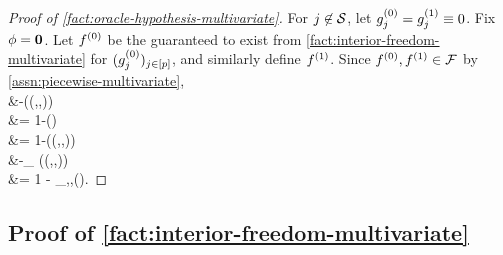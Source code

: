 \begin{proof}[Proof of \cref{fact:oracle-hypothesis-multivariate}]
For $j\not\in \mathcal{S}$, let $g^{(0)}_{j} = g^{(1)}_{j} \equiv 0$.
Fix $\phi = \mathbf{0}$.
Let $f^{(0)}$ be the \modelname{} guaranteed to exist from \cref{fact:interior-freedom-multivariate} for $(g^{(0)}_{j})_{j\in[p]}$, and similarly define $f^{(1)}$. Since $f^{(0)},f^{(1)}\in\mathcal{F}$ by \cref{assn:piecewise-multivariate},
\*[
    \specsym_{\expdef,\covdist,\covval}(\oraclehyptest) 
    &= \inf_{\model\in\modelspace\nullind} [1-\oraclehyptest(\expdef(\model,\covdist,\covval))] \\
    &-\oraclehyptest(\expdef(\model\nullind,\covdist,\covval)) \\
    &= 1-\oraclehyptest() \\
    &= 1-\oraclehyptest(\expdef(\model\altind,\covdist,\covval)) \\
    &-\inf_{\model\in\modelspace\altind} \oraclehyptest(\expdef(\model,\covdist,\covval)) \\
    &= 1 - \senssym_{\expdef,\covdist,\covval}(\oraclehyptest).
\]
\end{proof}

\subsection{Proof of \cref{fact:interior-freedom-multivariate}}

